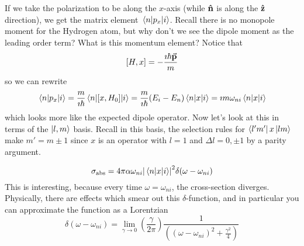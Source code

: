 \documentclass[a4paper,twoside,master.tex]{subfiles}
\begin{document}
If we take the polarization to be along the $ x $-axis (while $ \vu{n} $ is along the $ \vu{z} $ direction), we get the matrix element $ \mel{n}{p_x}{i} $. Recall there is no monopole moment for the Hydrogen atom, but why don't we see the dipole moment as the leading order term? What is this momentum element? Notice that
\begin{equation}
    \comm{H}{x} = - \frac{\imath \hbar \va{p}}{m}
\end{equation}
so we can rewrite
\begin{equation}
    \mel{n}{p_x}{i} = \frac{m}{\imath \hbar} \mel{n}{\comm{x}{H_0}}{i} = \frac{m}{\imath \hbar} (E_i - E_n) \mel{n}{x}{i} = \imath m \omega_{ni} \mel{n}{x}{i}
\end{equation}
which looks more like the expected dipole operator. Now let's look at this in terms of the $\ket{l,m} $ basis. Recall in this basis, the selection rules for $\bra{l'm'} x\ket{lm} $ make $ m' = m \pm 1 $ since $ x $ is an operator with $ l = 1 $ and $ \Delta l = 0, \pm 1 $ by a parity argument.

\begin{equation}
    \sigma_{\text{abs}} = 4 \pi \alpha \omega_{ni} \abs{\mel{n}{x}{i}}^2 \delta(\omega - \omega_{ni})
\end{equation}
This is interesting, because every time $ \omega = \omega_{ni} $, the cross-section diverges. Physically, there are effects which smear out this $\delta$-function, and in particular you can approximate the function as a Lorentzian
\begin{equation}
    \delta(\omega - \omega_{ni}) = \lim_{\gamma \to 0} \left( \frac{\gamma}{2 \pi} \right) \frac{1}{\left( (\omega - \omega_{ni})^2 + \frac{\gamma^2}{4} \right)}
\end{equation}
\end{document}
